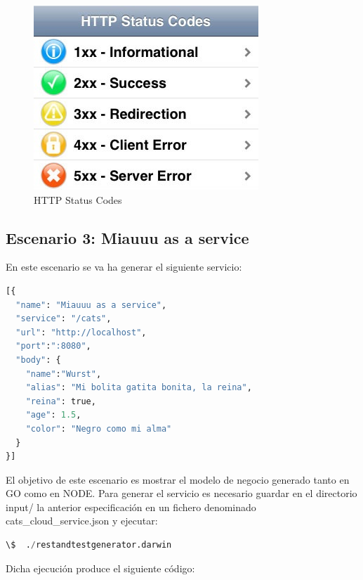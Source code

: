 \documentclass[a4paper,11pt]{book}
\begin{document}
\begin{figure}[H]  
\centering 
\includegraphics[scale=0.35]{imagenes/http.jpg}
\caption{ HTTP Status Codes}  
\end{figure}

\subsection{Escenario 3: Miauuu as a service}

En este escenario se va ha generar el siguiente servicio:

\begin{lstlisting}[language=python,caption={ cats\_cloud\_service.json }]
[{
  "name": "Miauuu as a service",
  "service": "/cats",
  "url": "http://localhost",
  "port":":8080",
  "body": {
    "name":"Wurst",
    "alias": "Mi bolita gatita bonita, la reina",
    "reina": true,
    "age": 1.5,
    "color": "Negro como mi alma"
  }
}]
\end{lstlisting}

El objetivo de este escenario es mostrar el modelo de negocio generado tanto en GO como en NODE. Para generar el servicio es necesario guardar en el directorio input/ la anterior especificación en un fichero denominado cats\_cloud\_service.json y ejecutar:

\begin{lstlisting}[language=python,caption={ Ejemplo Ejecución Generador: cats\_cloud\_service.json  }]
\$  ./restandtestgenerator.darwin 
\end{lstlisting} 

Dicha ejecución produce el siguiente código: 
\end{document}
